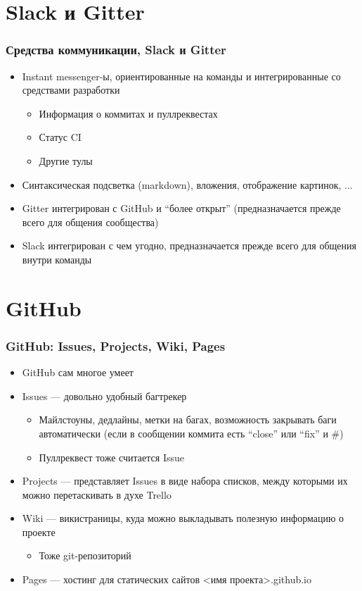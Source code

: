 \documentclass{../../slides-style}
\begin{document}
    \section{Slack и Gitter}

    \begin{frame}
        \frametitle{Средства коммуникации, Slack и Gitter}
        \begin{itemize}
            \item Instant messenger-ы, ориентированные на команды и интегрированные со средствами разработки
            \begin{itemize}
                \item Информация о коммитах и пуллреквестах
                \item Статус CI
                \item Другие тулы
            \end{itemize}
            \item Синтаксическая подсветка (markdown), вложения, отображение картинок, ...
            \item Gitter интегрирован с GitHub и ``более открыт'' (предназначается прежде всего для общения сообщества)
            \item Slack интегрирован с чем угодно, предназначается прежде всего для общения внутри команды
        \end{itemize}
    \end{frame}

    \section{GitHub}

    \begin{frame}
        \frametitle{GitHub: Issues, Projects, Wiki, Pages}
        \begin{itemize}
            \item GitHub сам многое умеет
            \item Issues --- довольно удобный багтрекер
            \begin{itemize}
                \item Майлстоуны, дедлайны, метки на багах, возможность закрывать баги автоматически (если в сообщении коммита есть ``close'' или ``fix'' и \#<номер бага>)
                \item Пуллреквест тоже считается Issue
            \end{itemize}
            \item Projects --- представляет Issues в виде набора списков, между которыми их можно перетаскивать в духе Trello
            \item Wiki --- викистраницы, куда можно выкладывать полезную информацию о проекте
            \begin{itemize}
                \item Тоже git-репозиторий
            \end{itemize}
            \item Pages --- хостинг для статических сайтов <имя проекта>.github.io
        \end{itemize}
    \end{frame}
\end{document}
